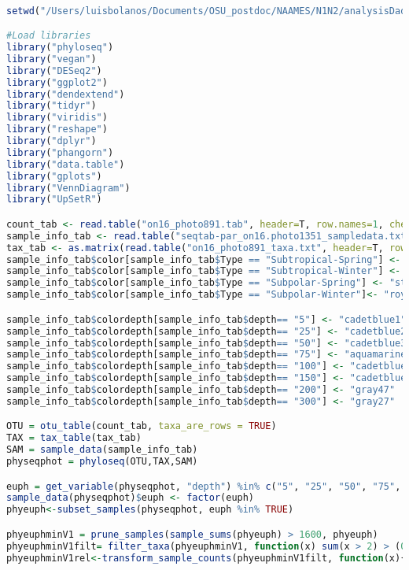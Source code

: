 \documentclass{article}
\begin{document}
\begin{lstlisting}[language=R,caption={N1N2figscripts}]

setwd("/Users/luisbolanos/Documents/OSU_postdoc/NAAMES/N1N2/analysisDada/Photo/FinalDatasets")

#Load libraries
library("phyloseq")
library("vegan")
library("DESeq2")
library("ggplot2")
library("dendextend")
library("tidyr")
library("viridis")
library("reshape")
library("dplyr")
library("phangorn")
library("data.table")
library("gplots")
library("VennDiagram")
library("UpSetR")

count_tab <- read.table("on16_photo891.tab", header=T, row.names=1, check.names=F)
sample_info_tab <- read.table("seqtab-par_on16.photo1351_sampledata.txt", header=T, row.names=1, check.names=F, sep ="\t")
tax_tab <- as.matrix(read.table("on16_photo891_taxa.txt", header=T, row.names=1, check.names=F, na.strings="", sep="\t"))
sample_info_tab$color[sample_info_tab$Type == "Subtropical-Spring"] <- "seagreen3"
sample_info_tab$color[sample_info_tab$Type == "Subtropical-Winter"] <- "darkgreen"
sample_info_tab$color[sample_info_tab$Type == "Subpolar-Spring"] <- "steelblue2"
sample_info_tab$color[sample_info_tab$Type == "Subpolar-Winter"]<- "royalblue"

sample_info_tab$colordepth[sample_info_tab$depth== "5"] <- "cadetblue1"
sample_info_tab$colordepth[sample_info_tab$depth== "25"] <- "cadetblue2"
sample_info_tab$colordepth[sample_info_tab$depth== "50"] <- "cadetblue3"
sample_info_tab$colordepth[sample_info_tab$depth== "75"] <- "aquamarine3"
sample_info_tab$colordepth[sample_info_tab$depth== "100"] <- "cadetblue4"
sample_info_tab$colordepth[sample_info_tab$depth== "150"] <- "cadetblue"
sample_info_tab$colordepth[sample_info_tab$depth== "200"] <- "gray47"
sample_info_tab$colordepth[sample_info_tab$depth== "300"] <- "gray27"

OTU = otu_table(count_tab, taxa_are_rows = TRUE)
TAX = tax_table(tax_tab)
SAM = sample_data(sample_info_tab)
physeqphot = phyloseq(OTU,TAX,SAM)

euph = get_variable(physeqphot, "depth") %in% c("5", "25", "50", "75", "100")
sample_data(physeqphot)$euph <- factor(euph)
phyeuph<-subset_samples(physeqphot, euph %in% TRUE)

phyeuphminV1 = prune_samples(sample_sums(phyeuph) > 1600, phyeuph)
phyeuphminV1filt= filter_taxa(phyeuphminV1, function(x) sum(x > 2) > (0.015*length(x)), TRUE) #This is going to be considered the master PHYLOSEQ OBJECT, where we are going to derive most of the data
phyeuphminV1rel<-transform_sample_counts(phyeuphminV1filt, function(x){x / sum(x)})


\end{lstlisting}
\end{document}

